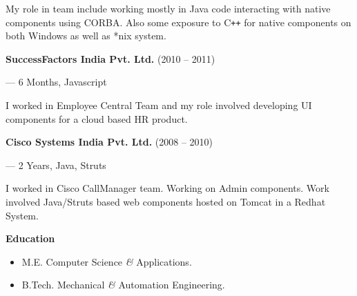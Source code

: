 \documentclass{article}
\begin{document}
   My role in team include working mostly in Java code interacting with native components using CORBA. Also some exposure to C{}\verb!++! for native components on both Windows as well as *nix system.
\begin{center}
   {\bf SuccessFactors India Pvt. Ltd.} (2010 -- 2011)\\ 
\end{center}
\begin{flushright}--- 6 Months, Javascript\end{flushright}
   I worked in Employee Central Team and my role involved developing UI components for a cloud based HR product.
\begin{center}
   {\bf Cisco Systems India Pvt. Ltd.} (2008 -- 2010)\\
\end{center}
\begin{flushright} --- 2{\thinspace\tiny\raisebox{0.5em}{1}\raisebox{0.25em}{/}\raisebox{-0.1em}{2}} Years, Java, Struts \end{flushright}
   I worked in Cisco CallManager team. Working on Admin components. Work involved Java/Struts based web components hosted on Tomcat in a Redhat System.
\begin{flushleft}
\large\bf{Education}
\end{flushleft}
\begin{itemize}
\item M.E. Computer Science {\it\&} Applications.
\item  B.Tech. Mechanical {\it\&} Automation Engineering.
\end{itemize}
\vfill
\hrulefill
\end{document}
